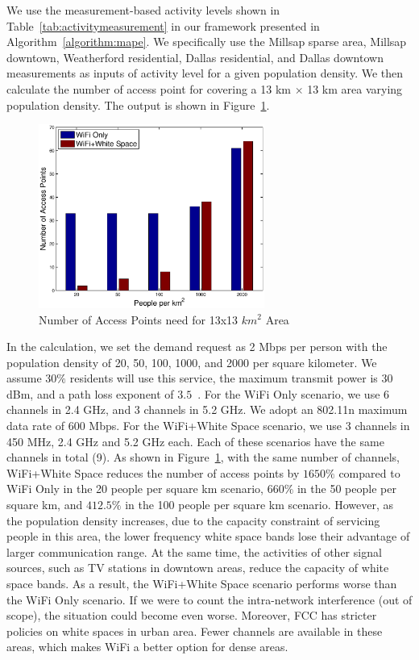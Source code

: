 We use the measurement-based activity levels shown in Table~\ref{tab:activitymeasurement} in our framework presented 
in Algorithm~\ref{algorithm:mape}. We specifically use the Millsap sparse area, Millsap downtown, Weatherford residential, Dallas residential, and Dallas 
downtown measurements as inputs of activity level for a given population density.
We then calculate the number of access point for covering 
a 13 km $\times$ 13 km area varying population density. The output is shown in Figure~\ref{fig:redensity}. 

   \begin{figure}
   \centering
   \includegraphics[width=74mm]{figures/redensity}
   \vspace{-0.1in}
   \caption{Number of Access Points need for 13x13 $km^2$ Area}
   \label{fig:redensity}
   \vspace{-0.3in}
   \end{figure}

In the calculation, we set the demand request as 2 Mbps per person with the population
density of 20, 50, 100, 1000, and 2000 per square kilometer. We assume $30\%$ residents will use this
service, the maximum transmit power is 30 dBm, and a path loss exponent of $3.5$~\cite{meikle2012global}. 
For the WiFi Only scenario, we use 6 channels in 2.4 GHz, and 3 channels in 5.2 GHz. 
We adopt an 802.11n maximum data rate of 600 Mbps. For the WiFi+White Space
scenario, we use 3 channels in 450 MHz, 2.4 GHz and 5.2 GHz each. Each of these scenarios have the 
same channels in total (9). As shown in Figure~\ref{fig:redensity},
with the same number of channels, WiFi+White Space reduces the number of access points by $1650\%$ compared to WiFi Only in the
20 people per square km scenario, $660\%$ in the 50 people per square km, and $412.5\%$ in the 100 people
per square km scenario. However, as the population density increases, due to the capacity constraint of servicing
people in this area, the lower frequency white space bands lose their advantage of larger communication range. 
At the same time, the activities of other signal sources, such as TV stations in downtown areas, reduce
the capacity of white space bands. As a result, the WiFi+White Space scenario performs worse than the WiFi Only scenario.
If we were to count the intra-network interference (out of scope), the situation could become even worse.
Moreover, FCC has stricter policies on white spaces in urban area. Fewer channels
are available in these areas, which makes WiFi a better option for dense areas.

